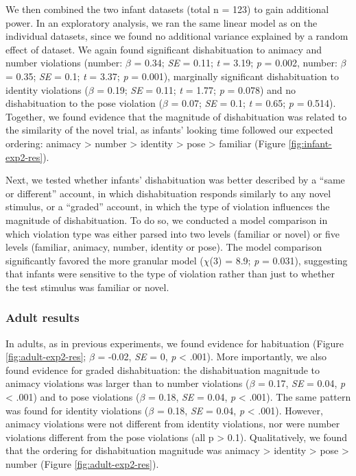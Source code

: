 \documentclass[
]{article}
\begin{document}
We then combined the two infant datasets (total n = 123) to gain additional power. In an exploratory analysis, we ran the same linear model as on the individual datasets, since we found no additional variance explained by a random effect of dataset. We again found significant dishabituation to animacy and number violations (number: \(\beta\) = 0.34; \emph{SE} = 0.11; \emph{t} = 3.19; \emph{p} = 0.002, number: \(\beta\) = 0.35; \emph{SE} = 0.1; \emph{t} = 3.37; \emph{p} = 0.001), marginally significant dishabituation to identity violations (\(\beta\) = 0.19; \emph{SE} = 0.11; \emph{t} = 1.77; \emph{p} = 0.078) and no dishabituation to the pose violation (\(\beta\) = 0.07; \emph{SE} = 0.1; \emph{t} = 0.65; \emph{p} = 0.514). Together, we found evidence that the magnitude of dishabituation was related to the similarity of the novel trial, as infants' looking time followed our expected ordering: animacy \textgreater{} number \textgreater{} identity \textgreater{} pose \textgreater{} familiar (Figure \ref{fig:infant-exp2-res}).

Next, we tested whether infants' dishabituation was better described by a ``same or different'' account, in which dishabituation responds similarly to any novel stimulus, or a ``graded'' account, in which the type of violation influences the magnitude of dishabituation. To do so, we conducted a model comparison in which violation type was either parsed into two levels (familiar or novel) or five levels (familiar, animacy, number, identity or pose). The model comparison significantly favored the more granular model (\(\chi\)(3) = 8.9; \emph{p} = 0.031), suggesting that infants were sensitive to the type of violation rather than just to whether the test stimulus was familiar or novel.

\subsubsection{Adult results}

In adults, as in previous experiments, we found evidence for habituation (Figure \ref{fig:adult-exp2-res}; \(\beta\) = -0.02, \emph{SE} = 0, \emph{p} \textless{} .001). More importantly, we also found evidence for graded dishabituation: the dishabituation magnitude to animacy violations was larger than to number violations (\(\beta\) = 0.17, \emph{SE} = 0.04, \emph{p} \textless{} .001) and to pose violations (\(\beta\) = 0.18, \emph{SE} = 0.04, \emph{p} \textless{} .001). The same pattern was found for identity violations (\(\beta\) = 0.18, \emph{SE} = 0.04, \emph{p} \textless{} .001). However, animacy violations were not different from identity violations, nor were number violations different from the pose violations (all p \textgreater{} 0.1). Qualitatively, we found that the ordering for dishabituation magnitude was animacy \textgreater{} identity \textgreater{} pose \textgreater{} number (Figure \ref{fig:adult-exp2-res}).
\end{document}
